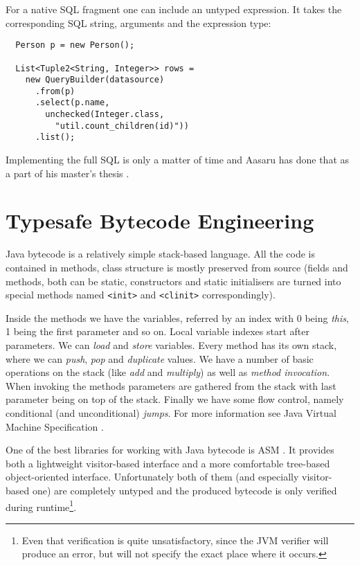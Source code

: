 \documentclass{sig-alternate}
\begin{document}
For a native SQL fragment one can include an untyped expression. It takes the corresponding SQL string, arguments and the expression type:

\begin{verbatim}
  Person p = new Person();

  List<Tuple2<String, Integer>> rows =
    new QueryBuilder(datasource)
      .from(p)
      .select(p.name,
        unchecked(Integer.class,
          "util.count_children(id)"))
      .list();
\end{verbatim}

Implementing the full SQL is only a matter of time and Aasaru has done that as a part of his master's thesis \cite{aasaru2008}.

\section{Typesafe Bytecode Engineering}

Java bytecode is a relatively simple stack-based language. All the code is contained in methods, class structure is mostly preserved from source (fields and methods, both can be static, constructors and static initialisers are turned into special methods named \verb!<init>! and \verb!<clinit>! correspondingly). 

Inside the methods we have the variables, referred by an index with $0$ being \emph{this}, 1 being the first parameter and so on. Local variable indexes start after parameters. We can \emph{load} and \emph{store} variables. Every method has its own  stack, where we can \emph{push}, \emph{pop} and \emph{duplicate} values. We have a number of basic operations on the stack (like \emph{add} and \emph{multiply}) as well as \emph{method invocation}. When invoking the methods parameters are gathered from the stack with last parameter being on top of the stack. Finally we have some flow control, namely conditional (and unconditional) \emph{jumps}. For more information see Java Virtual Machine Specification \cite{lindholm1999jvm}.

One of the best libraries for working with Java bytecode is ASM \cite{bruneton2002acm}. It provides both a lightweight visitor-based interface and a more comfortable tree-based object-oriented interface. Unfortunately both of them (and especially visitor-based one) are completely untyped and the produced bytecode is only verified during runtime\footnote{Even that verification is quite unsatisfactory, since the JVM verifier will produce an error, but will not specify the exact place where it occurs.}.
\end{document}
